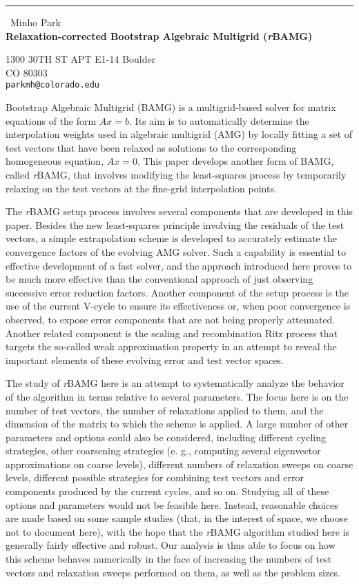 \documentclass{report}
\begin{document}
\begin{center}
\rule{6in}{1pt} \
{\large Minho Park \\
{\bf Relaxation-corrected Bootstrap Algebraic Multigrid (\textit{\MakeLowercase{r}}BAMG)}}

1300 30TH ST APT E1-14 Boulder \\ CO 80303
\\
{\tt parkmh@colorado.edu}\end{center}

Bootstrap Algebraic Multigrid (BAMG) is a multigrid-based solver for
matrix equations of the form $Ax=b$. Its aim is to automatically
determine the interpolation weights used in algebraic multigrid (AMG) by
locally fitting a set of test vectors that have been relaxed as solutions
to the corresponding homogeneous equation, $Ax=0$. This paper develops
another form of BAMG, called \textit{r}BAMG, that involves modifying the
least-squares process by temporarily relaxing on the test vectors at the
fine-grid interpolation points.

The \textit{r}BAMG setup process involves several components that are
developed in this paper. Besides the new least-squares principle
involving the residuals of the test vectors, a simple extrapolation
scheme is developed to accurately estimate the convergence factors of the
evolving AMG solver. Such a capability is essential to effective
development of a fast solver, and the approach introduced here proves to
be much more effective than the conventional approach of just observing
successive error reduction factors. Another component of the setup
process is the use of the current V-cycle to ensure its effectiveness or,
when poor convergence is observed, to expose error components that are
not being properly attenuated. Another related component is the scaling
and recombination Ritz process that targets the so-called weak
approximation property in an attempt to reveal the important elements of
these evolving error and test vector spaces.

The study of \textit{r}BAMG here is an attempt to systematically analyze
the behavior of the algorithm in terms relative to several parameters.
The focus here is on the number of test vectors, the number of
relaxations applied to them, and the dimension of the matrix to which the
scheme is applied. A large number of other parameters and options could
also be considered, including different cycling strategies, other
coarsening strategies (e. g., computing several eigenvector
approximations on coarse levels), different numbers of relaxation sweeps
on coarse levels, different possible strategies for combining test
vectors and error components produced by the current cycles, and so on.
Studying all of these options and parameters would not be feasible here.
Instead, reasonable choices are made based on some sample studies (that,
in the interest of space, we choose not to document here), with the hope
that the \textit{r}BAMG algorithm studied here is generally fairly
effective and robust. Our analysis is thus able to focus on how this
scheme behaves numerically in the face of increasing the numbers of test
vectors and relaxation sweeps performed on them, as well as the problem
sizes.
\end{document}
